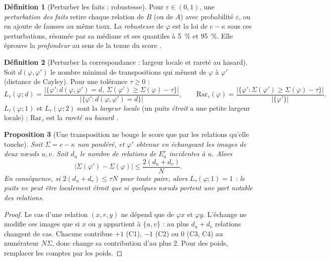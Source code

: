 \documentclass[11pt,a4paper]{article}
\theoremstyle{definition}
\newtheorem{definition}{Définition}[section]
\theoremstyle{plain}
\newtheorem{proposition}[definition]{Proposition}
\begin{document}
\begin{definition}[Perturber les faits : robustesse]
Pour $\varepsilon\in(0,1)$, une \emph{perturbation des faits} retire chaque relation de $B$ (ou de $A$)
avec probabilité $\varepsilon$, ou en ajoute de fausses au même taux. La \emph{robustesse} de $\varphi$
est la loi de $c-\kappa$ sous ces perturbations, résumée par sa médiane et ses quantiles à 5~\% et
95~\%. Elle éprouve la \emph{profondeur} au sens de la tenue du score \cite[correction (3)]{complement89}.
\end{definition}

\begin{definition}[Perturber la correspondance : largeur locale et rareté au hasard]
\label{def:largeur}
Soit $d(\varphi,\varphi')$ le nombre minimal de transpositions qui mènent de $\varphi$ à $\varphi'$
(distance de Cayley). Pour une tolérance $\tau\ge0$ :
\[ L_\tau(\varphi;d)=\frac{|\{\varphi':d(\varphi,\varphi')=d,\ \Sigma(\varphi')\ge\Sigma(\varphi)-\tau\}|}{|\{\varphi':d(\varphi,\varphi')=d\}|},\qquad
   \mathrm{Rar}_\tau(\varphi)=\frac{|\{\varphi':\Sigma(\varphi')\ge\Sigma(\varphi)-\tau\}|}{|\{\varphi'\}|}. \]
$L_\tau(\varphi;1)$ et $L_\tau(\varphi;2)$ sont la \emph{largeur locale} (un puits \emph{étroit} a une
petite largeur locale) ; $\mathrm{Rar}_\tau$ est la \emph{rareté au hasard} \cite{erratumq9}.
\end{definition}

\begin{proposition}[Une transposition ne bouge le score que par les relations qu'elle touche]
\label{prop:lipschitz}
Soit $\Sigma=c-\kappa$ non pondéré, et $\varphi'$ obtenue en échangeant les images de deux nœuds
$u,v$. Soit $d_u$ le nombre de relations de $E^r_a$ incidentes à $u$. Alors
\[ |\Sigma(\varphi')-\Sigma(\varphi)|\le\frac{2(d_u+d_v)}{N}. \]
En conséquence, si $2(d_u+d_v)\le\tau N$ pour toute paire, alors $L_\tau(\varphi;1)=1$ : le puits
ne peut être localement étroit que si quelques nœuds portent une part notable des relations.
\end{proposition}
\begin{proof}
Le cas d'une relation $(x,r,y)$ ne dépend que de $\varphi x$ et $\varphi y$. L'échange ne modifie
ces images que si $x$ ou $y$ appartient à $\{u,v\}$ : au plus $d_u+d_v$ relations changent de cas.
Chacune contribue $+1$ (C1), $-1$ (C2) ou $0$ (C3, C4) au numérateur $N\Sigma$, donc change sa
contribution d'au plus 2. Pour des poids, remplacer les comptes par les poids.
\end{proof}
\end{document}
